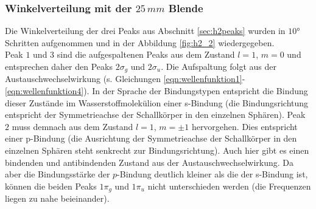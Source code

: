 \subsubsection{Winkelverteilung mit der $25 \, mm$ Blende}
Die Winkelverteilung der drei Peaks aus Abschnitt \ref{sec:h2peaks} wurden in $10°$ Schritten aufgenommen und in der Abbildung \ref{fig:h2_2} wiedergegeben. \\
Peak $1$ und $3$ sind die aufgespaltenen Peaks aus dem Zustand $l=1$, $m=0$ und entsprechen daher den Peaks $2\sigma_g$ und $2\sigma_u$. Die Aufspaltung folgt aus der Austauschwechselwirkung (s. Gleichungen \ref{eqn:wellenfunktion1}-\ref{eqn:wellenfunktion4}). In der Sprache der Bindungstypen entspricht die Bindung dieser Zustände im Wasserstoffmolekülion einer s-Bindung (die Bindungsrichtung entspricht der Symmetrieachse der Schallkörper in den einzelnen Sphären).
Peak $2$ muss demnach aus dem Zustand $l=1$, $m=\pm 1$ hervorgehen. Dies entspricht einer p-Bindung (die Ausrichtung der Symmetrieachse der Schallkörper in den einzelnen Sphären steht senkrecht zur Bindungsrichtung). Auch hier gibt es einen bindenden und antibindenden Zustand aus der Austauschwechselwirkung. Da aber die Bindungsstärke der $p$-Bindung deutlich kleiner als die der s-Bindung ist, können die beiden Peaks $1\pi_g$ und $1\pi_u$ nicht unterschieden werden (die Frequenzen liegen zu nahe beieinander). 

